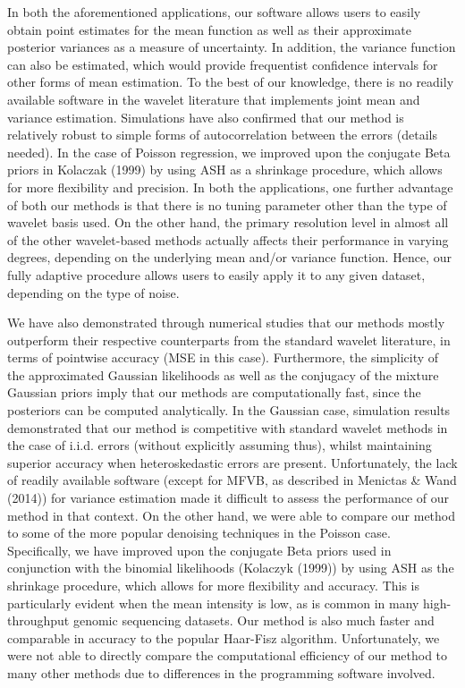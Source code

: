 \documentclass[12pt]{article}
\begin{document}
In both the aforementioned applications, our software allows users to easily obtain point estimates for the mean function as well as their approximate posterior variances as a measure of uncertainty. In addition, the variance function can also be estimated, which would provide frequentist confidence intervals for other forms of mean estimation. To the best of our knowledge, there is no readily available software in the wavelet literature that implements joint mean and variance estimation. Simulations have also confirmed that our method is relatively robust to simple forms of autocorrelation between the errors (details needed). In the case of Poisson regression, we improved upon the conjugate Beta priors in Kolaczak (1999) by using ASH as a shrinkage procedure, which allows for more flexibility and precision. %
In both the applications, one further advantage of both our methods is that there is no tuning parameter other than the type of wavelet basis used. On the other hand, the primary resolution level in almost all of the other wavelet-based methods actually affects their performance in varying degrees, depending on the underlying mean and/or variance function. Hence, our fully adaptive procedure allows users to easily apply it to any given dataset, depending on the type of noise.

We have also demonstrated through numerical studies that our methods mostly outperform their respective counterparts from the standard wavelet literature, in terms of pointwise accuracy (MSE in this case). Furthermore, the simplicity of the approximated Gaussian likelihoods as well as the conjugacy of the mixture Gaussian priors imply that our methods are computationally fast, since the posteriors can be computed analytically. In the Gaussian case, simulation results demonstrated that our method is competitive with standard wavelet methods in the case of i.i.d. errors (without explicitly assuming thus), whilst maintaining superior accuracy when heteroskedastic errors are present. Unfortunately, the lack of readily available software (except for MFVB, as described in Menictas \& Wand (2014)) for variance estimation made it difficult to assess the performance of our method in that context. On the other hand, we were able to compare our method to some of the more popular denoising techniques in the Poisson case. Specifically, we have improved upon the conjugate Beta priors used in conjunction with the binomial likelihoods (Kolaczyk (1999)) by using ASH as the shrinkage procedure, which allows for more flexibility and accuracy. This is particularly evident when the mean intensity is low, as is common in many high-throughput genomic sequencing datasets. Our method is also much faster and comparable in accuracy to the popular Haar-Fisz algorithm. Unfortunately, we were not able to directly compare the computational efficiency of our method to many other methods due to differences in the programming software involved.
\end{document}
